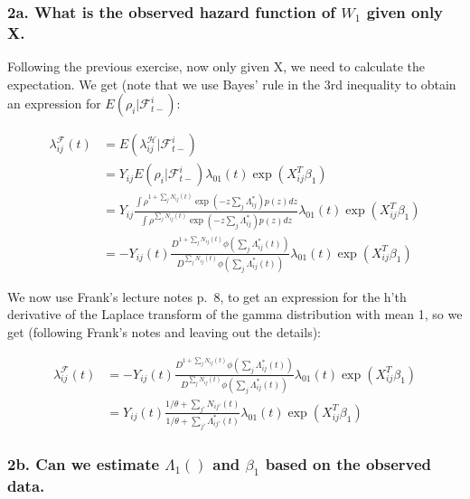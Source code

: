 \documentclass[
  11pt,
]{article}
\begin{document}
\hypertarget{a.-what-is-the-observed-hazard-function-of-w_1-given-only-x.}{%
\subsubsection{\texorpdfstring{2a. What is the observed hazard function
of \(W_1\) given only
X.}{2a. What is the observed hazard function of W\_1 given only X.}}\label{a.-what-is-the-observed-hazard-function-of-w_1-given-only-x.}}

Following the previous exercise, now only given X, we need to calculate
the expectation. We get (note that we use Bayes' rule in the 3rd
inequality to obtain an expression for \(E(\rho_i|\mathcal{F}^i_{t-})\):

\begin{align*}
\lambda_{ij}^{\mathcal{F}}(t) &= E(\lambda_{ij}^{\mathcal{H}} | \mathcal{F}^i_{t-} ) \\
&=Y_{ij} E(\rho_i|\mathcal{F}^i_{t-}) \lambda_{01}(t) \exp(X_{ij}^T\beta_1) \\
&=Y_{ij} \frac{\int \rho^{1+\sum_j N_{ij}(t)} \exp(-z \sum_j \Lambda^*_{ij}) p(z)dz}{\int \rho^{\sum_j N_{ij}(t)} \exp(-z \sum_j \Lambda^*_{ij}) p(z)dz} \lambda_{01}(t) \exp(X_{ij}^T\beta_1) \\
&=-Y_{ij}(t) \frac{D^{1+\sum_j N_{ij}(t)} \phi(\sum_j \Lambda^*_{ij}(t))}{D^{\sum_j N_{ij}(t)} \phi(\sum_j \Lambda^*_{ij}(t))} \lambda_{01}(t) \exp(X_{ij}^T\beta_1)
\end{align*}

We now use Frank's lecture notes p.~8, to get an expression for the h'th
derivative of the Laplace transform of the gamma distribution with mean
1, so we get (following Frank's notes and leaving out the details):

\begin{align*}
\lambda_{ij}^{\mathcal{F}}(t) &=-Y_{ij}(t) \frac{D^{1+\sum_j N_{ij}(t)} \phi(\sum_j \Lambda^*_{ij}(t))}{D^{\sum_j N_{ij}(t)} \phi(\sum_j \Lambda^*_{ij}(t))} \lambda_{01}(t) \exp(X_{ij}^T\beta_1) \\
&=Y_{ij}(t) \frac{1/\theta+\sum_{j'}N_{ij'}(t)}{1/\theta+\sum_{j'}\Lambda^*_{ij'}(t)}\lambda_{01}(t) \exp(X_{ij}^T\beta_1)
\end{align*}

\hypertarget{b.-can-we-estimate-lambda_1-and-beta_1-based-on-the-observed-data.}{%
\subsubsection{\texorpdfstring{2b. Can we estimate \(\Lambda_1()\) and
\(\beta_1\) based on the observed
data.}{2b. Can we estimate \textbackslash Lambda\_1() and \textbackslash beta\_1 based on the observed data.}}\label{b.-can-we-estimate-lambda_1-and-beta_1-based-on-the-observed-data.}}
\end{document}

